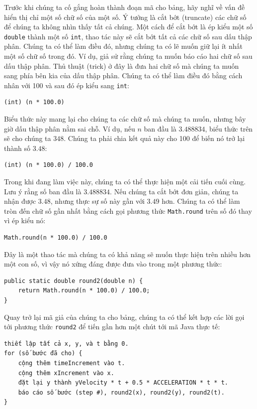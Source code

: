 Trước khi chúng ta cố gắng hoàn thành đoạn mã cho bảng, hãy nghĩ về vấn
đề hiển thị chỉ một số chữ số của một số. Ý tưởng là cắt bớt (truncate)
các chữ số để chúng ta không nhìn thấy tất cả chúng. Một cách để cắt bớt
là ép kiểu một số \texttt{double} thành một số \texttt{int}, thao tác
này sẽ cắt bớt tất cả các chữ số sau dấu thập phân. Chúng ta có thể làm
điều đó, nhưng chúng ta có lẽ muốn giữ lại ít nhất một số chữ số trong
đó. Ví dụ, giả sử rằng chúng ta muốn báo cáo hai chữ số sau dấu thập
phân. Thủ thuật (trick) ở đây là đưa hai chữ số mà chúng ta muốn sang
phía bên kia của dấu thập phân. Chúng ta có thể làm điều đó bằng cách
nhân với 100 và sau đó ép kiểu sang \texttt{int}:

\begin{verbatim}
(int) (n * 100.0)
\end{verbatim}

Biểu thức này mang lại cho chúng ta các chữ số mà chúng ta muốn, nhưng
bây giờ dấu thập phân nằm sai chỗ. Ví dụ, nếu \(n\) ban đầu là
\(3.488834\), biểu thức trên sẽ cho chúng ta \(348\). Chúng ta phải chia
kết quả này cho 100 để biến nó trở lại thành số \(3.48\):

\begin{verbatim}
(int) (n * 100.0) / 100.0
\end{verbatim}

Trong khi đang làm việc này, chúng ta có thể thực hiện một cải tiến cuối
cùng. Lưu ý rằng số ban đầu là \(3.488834\). Nếu chúng ta cắt bớt đơn
giản, chúng ta nhận được \(3.48\), nhưng thực sự số này gần với \(3.49\)
hơn. Chúng ta có thể làm tròn đến chữ số gần nhất bằng cách gọi phương
thức \texttt{Math.round} trên số đó thay vì ép kiểu nó:

\begin{verbatim}
Math.round(n * 100.0) / 100.0
\end{verbatim}

Đây là một thao tác mà chúng ta có khả năng sẽ muốn thực hiện trên nhiều
hơn một con số, vì vậy nó xứng đáng được đưa vào trong một phương thức:

\begin{verbatim}
public static double round2(double n) {
    return Math.round(n * 100.0) / 100.0;
}
\end{verbatim}

Quay trở lại mã giả của chúng ta cho bảng, chúng ta có thể kết hợp các
lời gọi tới phương thức \texttt{round2} để tiến gần hơn một chút tới mã
Java thực tế:

\begin{verbatim}
thiết lập tất cả x, y, và t bằng 0.
for (số bước đã cho) {
    cộng thêm timeIncrement vào t.
    cộng thêm xIncrement vào x.
    đặt lại y thành yVelocity * t + 0.5 * ACCELERATION * t * t.
    báo cáo số bước (step #), round2(x), round2(y), round2(t).
}
\end{verbatim}

